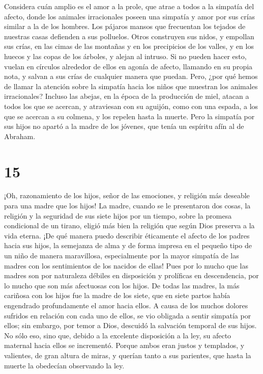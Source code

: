 Considera cuán amplio es el amor a la prole, que atrae a
todos a la simpatía del afecto,  donde los animales
irracionales poseen una simpatía y amor por sus crías similar a la de
los hombres.  Los pájaros mansos que frecuentan los
tejados de nuestras casas defienden a sus polluelos. 
Otros construyen sus nidos, y empollan sus crías, en las cimas de las
montañas y en los precipicios de los valles, y en los huecos y las copas
de los árboles, y alejan al intruso.  Si no pueden hacer
esto, vuelan en círculos alrededor de ellos en agonía de afecto,
llamando en su propia nota, y salvan a sus crías de cualquier manera que
puedan.  Pero, ¿por qué hemos de llamar la atención sobre
la simpatía hacia los niños que muestran los animales irracionales?
 Incluso las abejas, en la época de la producción de
miel, atacan a todos los que se acercan, y atraviesan con su aguijón,
como con una espada, a los que se acercan a su colmena, y los repelen
hasta la muerte.  Pero la simpatía por sus hijos no
apartó a la madre de los jóvenes, que tenía un espíritu afín al de
Abraham.

\hypertarget{section-14}{%
\section{15}\label{section-14}}

 ¡Oh, razonamiento de los hijos, señor de las emociones, y
religión más deseable para una madre que los hijos!  La
madre, cuando se le presentaron dos cosas, la religión y la seguridad de
sus siete hijos por un tiempo, sobre la promesa condicional de un
tirano,  eligió más bien la religión que según Dios
preserva a la vida eterna.  ¡De qué manera puedo describir
éticamente el afecto de los padres hacia sus hijos, la semejanza de alma
y de forma impresa en el pequeño tipo de un niño de manera maravillosa,
especialmente por la mayor simpatía de las madres con los sentimientos
de los nacidos de ellas!  Pues por lo mucho que las madres
son por naturaleza débiles en disposición y prolíficas en descendencia,
por lo mucho que son más afectuosas con los hijos.  De
todas las madres, la más cariñosa con los hijos fue la madre de los
siete, que en siete partos había engendrado profundamente el amor hacia
ellos.  A causa de los muchos dolores sufridos en relación
con cada uno de ellos, se vio obligada a sentir simpatía por ellos;
 sin embargo, por temor a Dios, descuidó la salvación
temporal de sus hijos.  No sólo eso, sino que, debido a la
excelente disposición a la ley, su afecto maternal hacia ellos se
incrementó.  Porque ambos eran justos y templados, y
valientes, de gran altura de miras, y querían tanto a sus parientes, que
hasta la muerte la obedecían observando la ley.

